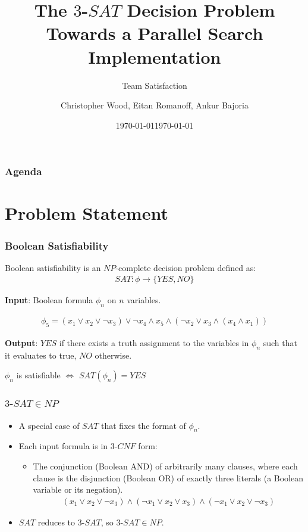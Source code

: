 \documentclass[handout]{beamer}
\title[Team Satisfaction - $3$-$SAT$]{The $3$-$SAT$ Decision Problem \\ Towards a Parallel Search Implementation}
\institute[RIT]{}
\date{\today}
\subtitle{Team Satisfaction}
\author{Christopher Wood, Eitan Romanoff, Ankur Bajoria}
\date{\today}
\begin{document}
\begin{frame}
	\titlepage
\end{frame}

\begin{frame}
	\frametitle{Agenda}
	\tableofcontents
\end{frame}

\section{Problem Statement}
\begin{frame}
	\frametitle{Boolean Satisfiability}

	Boolean satisfiability is an $NP$-complete decision problem defined as:
	\begin{align*}
	SAT : \phi \to \{YES, NO\}
	\end{align*}

	\medskip

	\textbf{Input}: Boolean formula $\phi_n$ on $n$ variables.
	
	\begin{align*}
		\phi_5 = (x_1 \lor x_2 \lor \lnot x_3) \lor \lnot x_4 \land x_5 \land (\lnot x_2 \lor x_3 \land (x_4 \land x_1))
	\end{align*}

	\medskip 

	\textbf{Output}: $YES$ if there exists a truth assignment to the
	variables in $\phi_n$ such that it evaluates to true, $NO$ otherwise.

	\medskip

	\begin{center}
		$\phi_n$ is satisfiable $\Leftrightarrow$ $SAT(\phi_n) = YES$
	\end{center}

\end{frame}


\begin{frame}
	\frametitle{$3$-$SAT \in NP$}
	\begin{itemize}
		\item A special case of $SAT$ that fixes the format of $\phi_n$.
		\item Each input formula is in $3$-$CNF$ form:
		\begin{itemize}
			\item The conjunction (Boolean AND) of arbitrarily many clauses, 
			where each clause is the disjunction (Boolean OR) of exactly three literals 
			(a Boolean variable or its negation).
			\begin{align*}
				(x_1 \lor x_2 \lor \lnot x_3) \land (\lnot x_1 \lor x_2 \lor x_3) \land (\lnot x_1 \lor x_2 \lor \lnot x_3)
			\end{align*}
		\end{itemize}
		\item $SAT$ reduces to $3$-$SAT$, so $3$-$SAT \in NP$.
	\end{itemize}
\end{frame}
\end{document}
